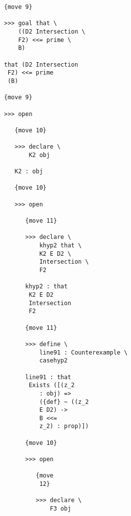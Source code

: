 \documentclass[12pt]{article}
\begin{document}
\begin{verbatim}
                           {move 9}

                           >>> goal that \
                               ((D2 Intersection \
                               F2) <<= prime \
                               B)

                           that (D2 Intersection 
                            F2) <<= prime 
                            (B)

                           {move 9}

                           >>> open

                              {move 10}

                              >>> declare \
                                  K2 obj

                              K2 : obj

                              {move 10}

                              >>> open

                                 {move 11}

                                 >>> declare \
                                     khyp2 that \
                                     K2 E D2 \
                                     Intersection \
                                     F2

                                 khyp2 : that 
                                  K2 E D2 
                                  Intersection 
                                  F2

                                 {move 11}

                                 >>> define \
                                     line91 : Counterexample \
                                     casehyp2

                                 line91 : that 
                                  Exists ([(z_2 
                                     : obj) => 
                                     ({def} ~ ((z_2 
                                     E D2) -> 
                                     B <<= 
                                     z_2) : prop)])

                                 {move 10}

                                 >>> open

                                    {move 
                                     12}

                                    >>> declare \
                                        F3 obj


\end{verbatim}
\end{document}
